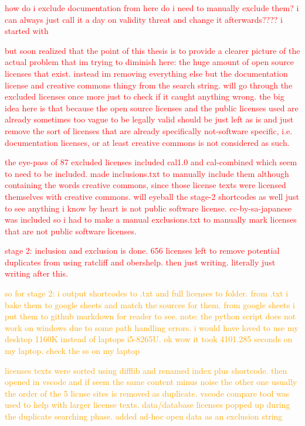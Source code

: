 \textcolor{red}{how do i exclude documentation from here do i need to manually exclude them? i can always just call it a day on validity threat and change it afterwards???? i started with}

\textcolor{red}{but soon realized that the point of this thesis is to provide a clearer picture of the actual problem that im trying to diminish here: the huge amount of open source licenses that exist. instead im removing everything else but the documentation license and creative commons thingy from the search string. will go through the excluded licenses once more just to check if it caught anything wrong. the big idea here is that because the open source licenses and the public licenses used are already sometimes too vague to be legally valid should be just left as is and just remove the sort of licenses that are already specifically not-software specific, i.e. documentation licenses, or at least creative commons is not considered as such.}

\textcolor{red}{the eye-pass of 87 excluded licenses included cal1.0 and cal-combined which seem to need to be included. made inclusions.txt to manually include them although containing the words creative commons, since those license texts were licensed themselves with creative commons. will eyeball the stage-2 shortcodes as well just to see anything i know by heart is not public software license. cc-by-sa-japanese was included so i had to make a manual exclusions.txt to manually mark licenses that are not public software licenses.}

\textcolor{red}{stage 2: inclusion and exclusion is done. 656 licenses left to remove potential duplicates from using ratcliff and obershelp. then just writing. literally just writing after this.}

\textcolor{orange}{so for stage 2: i output shortcodes to .txt and full licenses to folder. from .txt i bake them to google sheets and match the sources for them. from google sheets i put them to github markdown for reader to see. note: the python script does not work on windows due to some path handling errors. i would have loved to use my desktop 1160K instead of laptops i5-8265U. ok wow it took 4101.285 seconds on my laptop. check the ss on my laptop}

\textcolor{orange}{licenses texts were sorted using difflib and renamed index plus shortcode. then opened in vscode and if seem the same content minus noise the other one usually the order of the 5 licnse sites is removed as duplicate. vscode compare tool was used to help with larger license texts. data/database licenses popped up during the duplicate searching phase. added ad-hoc open data as an exclusion string}


